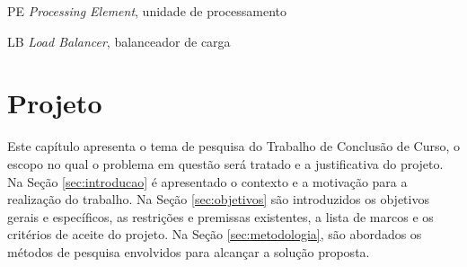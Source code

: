\documentclass[
	12pt,				%
	openright,			%
	twoside,			%
	a4paper,			%
	english,			%
	brazil,				%
	]{abntex2}
\begin{document}
 



\begin{siglas}
  \item[PE] \textit{Processing Element}, unidade de processamento
  \item[LB] \textit{Load Balancer}, balanceador de carga
\end{siglas}


\tableofcontents*
\cleardoublepage



\textual


\chapter{Projeto}

Este capítulo apresenta o tema de pesquisa do Trabalho de Conclusão de Curso, o escopo no qual o problema em questão será tratado e a justificativa do projeto. Na Seção \ref{sec:introducao} é apresentado o contexto e a motivação para a realização do trabalho. Na Seção \ref{sec:objetivos} são introduzidos os objetivos gerais e específicos, as restrições e premissas existentes, a lista de marcos e os critérios de aceite do projeto. Na Seção \ref{sec:metodologia}, são abordados os métodos de pesquisa envolvidos para alcançar a solução proposta.
\end{document}
